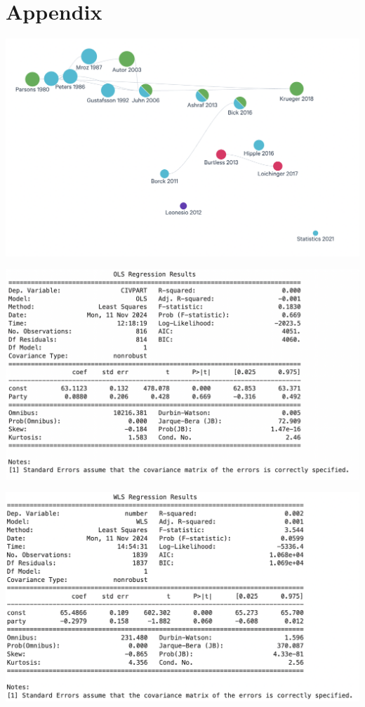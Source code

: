 \chapter{Appendix}

\includegraphics[width=0.7\linewidth]{files/litmap-ba9102f2e95757a03bd4124d2527438a.png}

\includegraphics[width=0.7\linewidth]{files/OLS-348f374a4f0124bf96bad39e0494e1f2.png}

\includegraphics[width=0.7\linewidth]{files/WLS-c513dc796a7e1b69f6856fefaa83e78e.png}